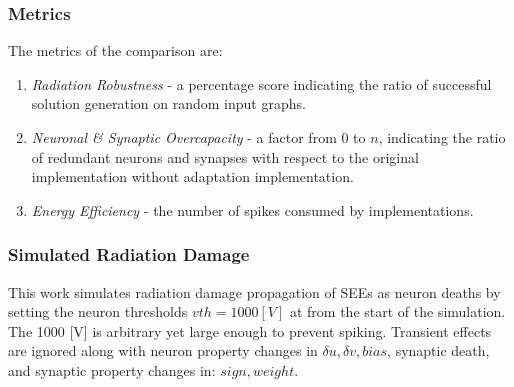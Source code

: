 \subsubsection{Metrics}\label{subsubsec:metrics}
The metrics of the comparison are:
\begin{enumerate}
    \item \textit{Radiation Robustness} - a percentage score indicating the ratio of successful solution generation on random input graphs.
    \item \textit{Neuronal \& Synaptic Overcapacity} - a factor from 0 to $n$, indicating the ratio of redundant neurons and synapses with respect to the original implementation without adaptation implementation. %
    \item \textit{Energy Efficiency} - the number of spikes consumed by implementations.
\end{enumerate}

\subsubsection{Simulated Radiation Damage}\label{subsubsec:simulated_radiation_damage}
This work simulates radiation damage propagation of SEEs as neuron deaths by setting the neuron thresholds $vth=1000 [V]$ at from the start of the simulation. The 1000 [V] is arbitrary yet large enough to prevent spiking. Transient effects are ignored along with neuron property changes in $\delta u,\delta v, bias$, synaptic death, and synaptic property changes in: $sign,weight$.

